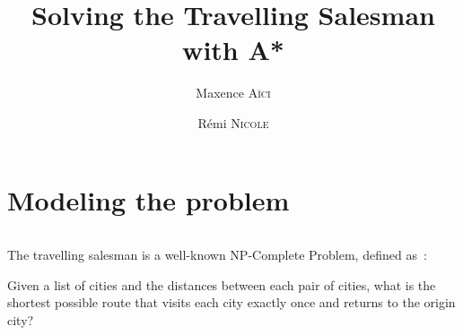 \documentclass[french]{article}
\title{Solving the Travelling Salesman with A*}
\author{Maxence \textsc{Aïci} \and Rémi \textsc{Nicole}}
\begin{document}
\maketitle

\part{Modeling the problem}

\paragraph{}
The travelling salesman is a well-known NP-Complete Problem, defined as~\cite{wiki:tsp}:

Given a list of cities and the distances between each pair of cities, what is the shortest possible route that visits each city exactly once and returns to the origin city?

\printbibliography%
\end{document}

